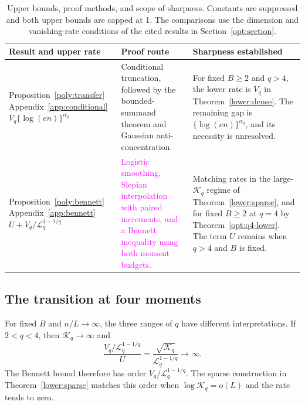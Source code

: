 \documentclass[11pt,letterpaper]{article}
\theoremstyle{remark}
\begin{document}
\begin{table}[htbp]
\centering
\small
\renewcommand{\arraystretch}{1.15}
\begin{tabularx}{\textwidth}{@{}>{\raggedright\arraybackslash}p{}
 >{\raggedright\arraybackslash}p{}
 >{\raggedright\arraybackslash}X@{}}
\toprule
Result and upper rate & Proof route & Sharpness established\\
\midrule
Proposition~\ref{poly:transfer}\newline
Appendix~\ref{app:conditional}\newline
\(V_q\{\log(en)\}^{\alpha_q}\)
& Conditional truncation, followed by the bounded-summand theorem and
Gaussian anti-concentration.
& For fixed \(B\ge2\) and \(q>4\), the lower rate is \(V_q\) in
Theorem~\ref{lower:dense}. The remaining gap is
\(\{\log(en)\}^{\alpha_q}\), and its necessity is unresolved.\\[0.6em]
Proposition~\ref{poly:bennett}\newline
Appendix~\ref{app:bennett}\newline
\(U+V_q/\mathcal{L}_q^{1-1/q}\)
& \textcolor{magenta}{Logistic smoothing, Slepian interpolation with
paired increments, and a Bennett inequality using both moment budgets.}
& Matching rates in the large-\(\mathcal K_q\) regime of
Theorem~\ref{lower:sparse}, and for fixed \(B\ge2\) at \(q=4\)
by Theorem~\ref{opt:q4-lower}. The term \(U\) remains when \(q>4\)
and \(B\) is fixed.\\
\bottomrule
\end{tabularx}
\caption{Upper bounds, proof methods, and scope of sharpness.
Constants are suppressed and both upper bounds are capped at 1.
The comparisons use the dimension and vanishing-rate conditions of
the cited results in Section~\ref{opt:section}.}
\label{poly:summary}
\end{table}

\subsection{The transition at four moments}\label{poly:transition}

For fixed \(B\) and \(n/L\to\infty\), the three ranges of \(q\)
have different interpretations. If \(2<q<4\), then \(\mathcal K_q\to\infty\)
and
\[
 \frac{V_q/\mathcal{L}_q^{1-1/q}}{U}
   =\frac{\sqrt{\mathcal K_q}}{\mathcal{L}_q^{1-1/q}}\longrightarrow\infty.
\]
The Bennett bound therefore has order \(V_q/\mathcal{L}_q^{1-1/q}\).
The sparse construction in Theorem~\ref{lower:sparse} matches this
order when \(\log \mathcal K_q=o(L)\) and the rate tends to zero.
\end{document}
